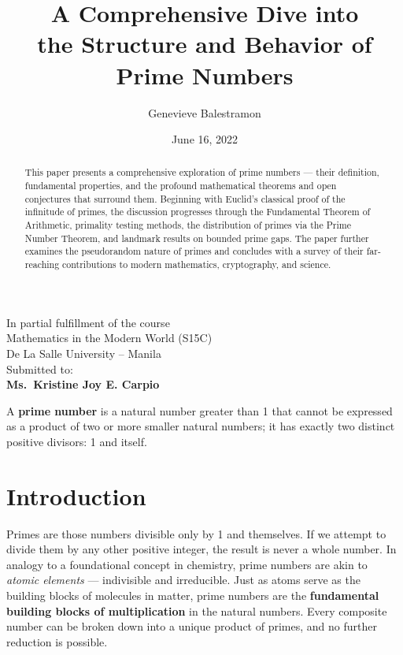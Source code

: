 \documentclass[11pt]{article}
\theoremstyle{plain}
\theoremstyle{definition}
\theoremstyle{remark}
\begin{document}
\title{A Comprehensive Dive into \\ the Structure and Behavior of Prime Numbers}
\author{Genevieve Balestramon}
\date{June 16, 2022}
\maketitle

\begin{abstract}
	This paper presents a comprehensive exploration of prime numbers — their definition, fundamental properties, and the profound mathematical theorems and open conjectures that surround them. Beginning with Euclid's classical proof of the infinitude of primes, the discussion progresses through the Fundamental Theorem of Arithmetic, primality testing methods, the distribution of primes via the Prime Number Theorem, and landmark results on bounded prime gaps. The paper further examines the pseudorandom nature of primes and concludes with a survey of their far-reaching contributions to modern mathematics, cryptography, and science.
\end{abstract}

\begin{center}
    \bigskip\bigskip\bigskip
    In partial fulfillment of the course\\
    \smallskip
    Mathematics in the Modern World (S15C)\\
    \bigskip\bigskip
    De La Salle University -- Manila\\
    \bigskip\bigskip\bigskip\bigskip\bigskip\bigskip
    \bigskip\bigskip\bigskip\bigskip\bigskip\bigskip
    Submitted to:\\
    \textbf{Ms.\ Kristine Joy E. Carpio}
    \bigskip\bigskip\bigskip
\end{center}

\newpage
\tableofcontents
\eject

A \textbf{prime number} is a natural number greater than 1 that cannot be expressed as a product of two or more smaller natural numbers; it has exactly two distinct positive divisors: 1 and itself.

\section{Introduction}

\par Primes are those numbers divisible only by 1 and themselves. If we attempt to divide them by any other positive integer, the result is never a whole number. In analogy to a foundational concept in chemistry, prime numbers are akin to \textit{atomic elements} — indivisible and irreducible. Just as atoms serve as the building blocks of molecules in matter, prime numbers are the \textbf{fundamental building blocks of multiplication} in the natural numbers. Every composite number can be broken down into a unique product of primes, and no further reduction is possible.
\end{document}
